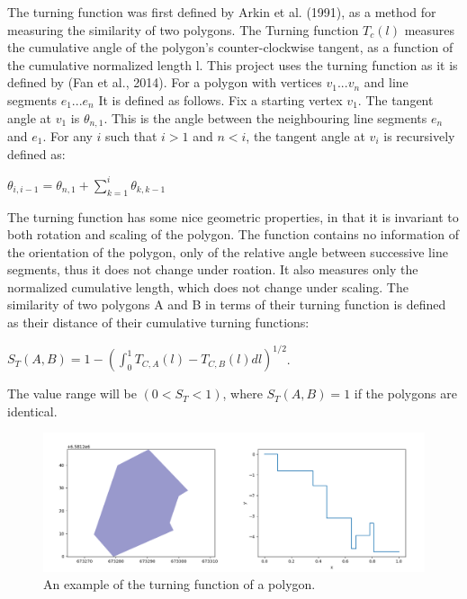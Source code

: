 \documentclass[a4paper]{article}
\begin{document}
The turning function was first defined by Arkin et al. (1991), as a method for measuring the similarity of two polygons. The Turning function $T_c(l)$ measures the cumulative angle of the polygon's counter-clockwise tangent, as a function of the cumulative normalized length l. This project uses the turning function as it is defined by (Fan et al., 2014). For a polygon with vertices ${v_1 ... v_n}$ and line segments ${e_1 ... e_n}$ It is defined as follows.
Fix a starting vertex $v_1$.
The tangent angle at $v_1$ is $\theta_{n,1}$. This is the angle between the neighbouring line segments $e_n$ and $e_1$.
For any $i$ such that $i>1$ and $n<i$, the tangent angle at $v_i$ is recursively defined as:
\begin{center}
    $\theta_{i, i-1} = \theta_{n,1} + \sum^{i}_{k=1} \theta_{k, k-1}$
\end{center}
The turning function has some nice geometric properties, in that it is invariant to both rotation and scaling of the polygon. The function contains no information of the orientation of the polygon, only of the relative angle between successive line segments, thus it does not change under roation. It also measures only the normalized cumulative length, which does not change under scaling.
The similarity of two polygons A and B in terms of their turning function is defined as their distance of their cumulative turning functions:
\begin{center}
    $S_{T}(A, B) = 1 - (\int^{1}_{0} T_{C,A}(l) - T_{C,B}(l) dl)^{1/2}$.
\end{center}
The value range will be $(0 < S_{T} < 1)$, where $S_{T}(A,B) = 1$ if the polygons are identical. 



\begin{figure}[H]
    \centering
    \includegraphics[width=\textwidth,height=0.5\textheight,keepaspectratio]{img_turn_function}
    \caption{An example of the turning function of a polygon.}
    \label{fig:space}
\end{figure}
\end{document}

